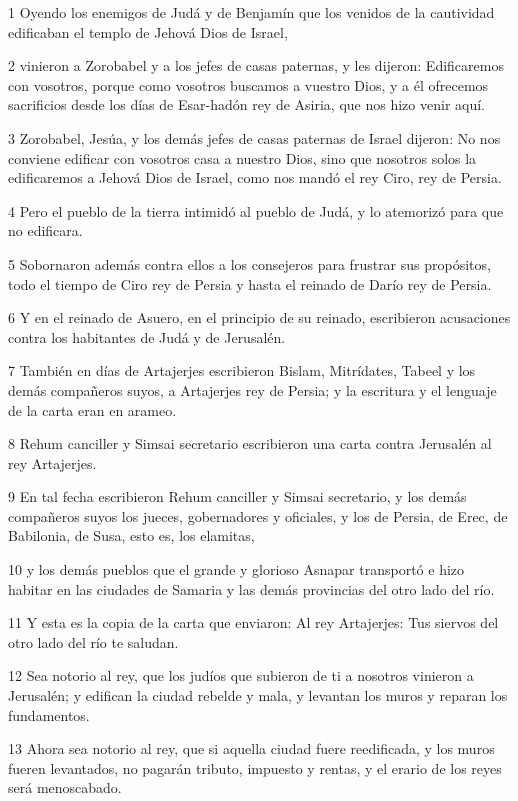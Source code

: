 \par 1 Oyendo los enemigos de Judá y de Benjamín que los venidos de la cautividad edificaban el templo de Jehová Dios de Israel,
\par 2 vinieron a Zorobabel y a los jefes de casas paternas, y les dijeron: Edificaremos con vosotros, porque como vosotros buscamos a vuestro Dios, y a él ofrecemos sacrificios desde los días de Esar-hadón rey de Asiria, que nos hizo venir aquí. 
\par 3 Zorobabel, Jesúa, y los demás jefes de casas paternas de Israel dijeron: No nos conviene edificar con vosotros casa a nuestro Dios, sino que nosotros solos la edificaremos a Jehová Dios de Israel, como nos mandó el rey Ciro, rey de Persia.
\par 4 Pero el pueblo de la tierra intimidó al pueblo de Judá, y lo atemorizó para que no edificara.
\par 5 Sobornaron además contra ellos a los consejeros para frustrar sus propósitos, todo el tiempo de Ciro rey de Persia y hasta el reinado de Darío rey de Persia.
\par 6 Y en el reinado de Asuero, en el principio de su reinado, escribieron acusaciones contra los habitantes de Judá y de Jerusalén.
\par 7 También en días de Artajerjes escribieron Bislam, Mitrídates, Tabeel y los demás compañeros suyos, a Artajerjes rey de Persia; y la escritura y el lenguaje de la carta eran en arameo.
\par 8 Rehum canciller y Simsai secretario escribieron una carta contra Jerusalén al rey Artajerjes.
\par 9 En tal fecha escribieron Rehum canciller y Simsai secretario, y los demás compañeros suyos los jueces, gobernadores y oficiales, y los de Persia, de Erec, de Babilonia, de Susa, esto es, los elamitas,
\par 10 y los demás pueblos que el grande y glorioso Asnapar transportó e hizo habitar en las ciudades de Samaria y las demás provincias del otro lado del río.
\par 11 Y esta es la copia de la carta que enviaron: Al rey Artajerjes: Tus siervos del otro lado del río te saludan.
\par 12 Sea notorio al rey, que los judíos que subieron de ti a nosotros vinieron a Jerusalén; y edifican la ciudad rebelde y mala, y levantan los muros y reparan los fundamentos.
\par 13 Ahora sea notorio al rey, que si aquella ciudad fuere reedificada, y los muros fueren levantados, no pagarán tributo, impuesto y rentas, y el erario de los reyes será menoscabado.
